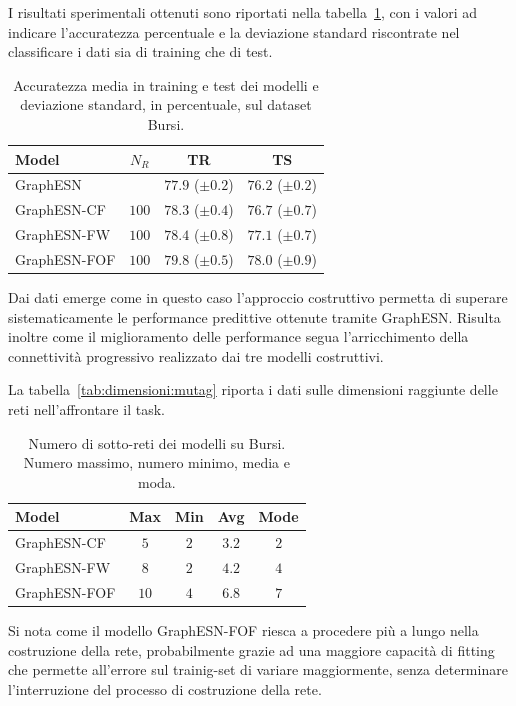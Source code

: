 I risultati sperimentali ottenuti sono riportati nella tabella~\ref{tab:esperimenti:bursi}, con i valori ad indicare l'accuratezza percentuale e la deviazione standard riscontrate nel classificare i dati sia di training che di test.
\begin{table}[tbp]
\small
\caption[Accuratezza media su Bursi]{Accuratezza media in training e test dei modelli e deviazione standard, in percentuale, sul dataset Bursi.}
\label{tab:esperimenti:bursi} 
\centering	
\begin{tabular}{l*{3}{c}}
\toprule
Model           & $N_R$     & TR                    & TS        \\
\midrule
GraphESN        &           & $77.9$ ($\pm 0.2$)    & $76.2$ ($\pm 0.2$) \\
GraphESN-CF     & $100$     & $78.3$ ($\pm 0.4$)    & $76.7$ ($\pm 0.7$) \\
GraphESN-FW     & $100$     & $78.4$ ($\pm 0.8$)    & $77.1$ ($\pm 0.7$) \\
GraphESN-FOF    & $100$     & $79.8$ ($\pm 0.5$)    & $78.0$ ($\pm 0.9$) \\
\bottomrule
\end{tabular}
\end{table}
Dai dati emerge come in questo caso l'approccio costruttivo permetta di superare sistematicamente le performance predittive ottenute tramite GraphESN. Risulta inoltre come il miglioramento delle performance segua l'arricchimento della connettività progressivo realizzato dai tre modelli costruttivi.

La tabella~\ref{tab:dimensioni:mutag} riporta i dati sulle dimensioni raggiunte delle reti nell'affrontare il task.
\begin{table}
\small
\caption[Dimensioni delle reti su Bursi]{Numero di sotto-reti dei modelli su Bursi. Numero massimo, numero minimo, media e moda.}
\label{tab:dimensioni:bursi} 
\centering	
\begin{tabular}{l*{4}{c}}
\toprule
Model 		 & Max & Min & Avg & Mode \\
\midrule
GraphESN-CF  & $5$ & $2$ & $3.2$ & $2$ \\
GraphESN-FW  & $8$ & $2$ & $4.2$ & $4$ \\
GraphESN-FOF & $10$ & $4$ & $6.8$ & $7$ \\
\bottomrule
\end{tabular}
\end{table}
Si nota come il modello GraphESN-FOF riesca a procedere più a lungo nella costruzione della rete, probabilmente grazie ad una maggiore capacità di fitting che permette all'errore sul trainig-set di variare maggiormente, senza determinare l'interruzione del processo di costruzione della rete.

